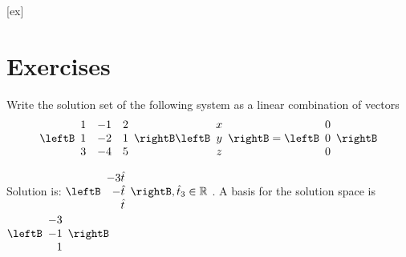 [ex]
\section*{Exercises}

\begin{enumialphparenastyle}

\begin{ex} \label{exerlineartransf2}Write the solution set of the following system as a linear combination of vectors  
\begin{equation*}
\leftB
\begin{array}{rrr}
1 & -1 & 2 \\
1 & -2 & 1 \\
3 & -4 & 5
\end{array}
\rightB \leftB
\begin{array}{c}
x \\
y \\
z
\end{array}
\rightB =\leftB
\begin{array}{r}
0 \\
0 \\
0
\end{array}
\rightB 
\end{equation*}
\begin{sol}
Solution is: $\leftB
\begin{array}{r}
-3\hat{t} \\
-\hat{t} \\
\hat{t}
\end{array}
\rightB ,\hat{t}_{3}\in \mathbb{R}$ . A basis for the solution space is $
\leftB
\begin{array}{r}
-3 \\
-1 \\
1
\end{array}
\rightB$
\end{sol}
\end{ex}


\end{enumialphparenastyle}

